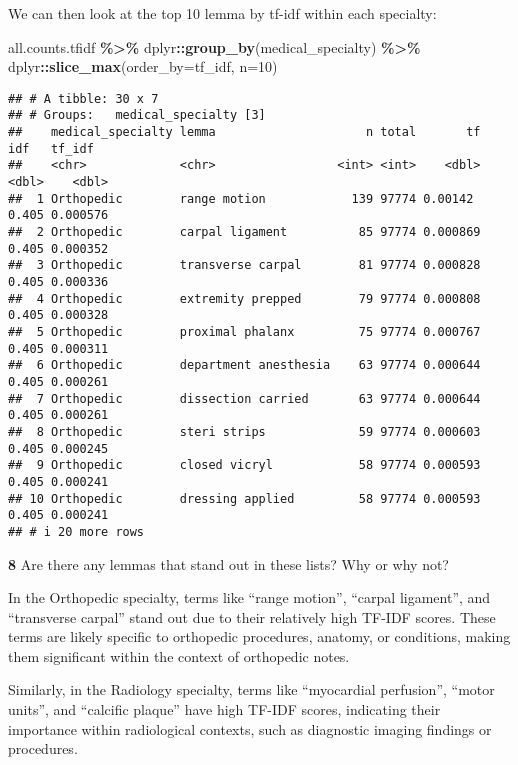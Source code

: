 \documentclass[
]{article}
\newenvironment{Shaded}{\begin{snugshade}}{\end{snugshade}}
\newcommand{\AttributeTok}[1]{\textcolor[rgb]{0.13,0.29,0.53}{#1}}
\newcommand{\DecValTok}[1]{\textcolor[rgb]{0.00,0.00,0.81}{#1}}
\newcommand{\FunctionTok}[1]{\textcolor[rgb]{0.13,0.29,0.53}{\textbf{#1}}}
\newcommand{\NormalTok}[1]{#1}
\newcommand{\SpecialCharTok}[1]{\textcolor[rgb]{0.81,0.36,0.00}{\textbf{#1}}}
\begin{document}
We can then look at the top 10 lemma by tf-idf within each specialty:

\begin{Shaded}
\begin{Highlighting}[]
\NormalTok{all.counts.tfidf }\SpecialCharTok{\%\textgreater{}\%}\NormalTok{ dplyr}\SpecialCharTok{::}\FunctionTok{group\_by}\NormalTok{(medical\_specialty) }\SpecialCharTok{\%\textgreater{}\%}\NormalTok{ dplyr}\SpecialCharTok{::}\FunctionTok{slice\_max}\NormalTok{(}\AttributeTok{order\_by=}\NormalTok{tf\_idf, }\AttributeTok{n=}\DecValTok{10}\NormalTok{)}
\end{Highlighting}
\end{Shaded}

\begin{verbatim}
## # A tibble: 30 x 7
## # Groups:   medical_specialty [3]
##    medical_specialty lemma                     n total       tf   idf   tf_idf
##    <chr>             <chr>                 <int> <int>    <dbl> <dbl>    <dbl>
##  1 Orthopedic        range motion            139 97774 0.00142  0.405 0.000576
##  2 Orthopedic        carpal ligament          85 97774 0.000869 0.405 0.000352
##  3 Orthopedic        transverse carpal        81 97774 0.000828 0.405 0.000336
##  4 Orthopedic        extremity prepped        79 97774 0.000808 0.405 0.000328
##  5 Orthopedic        proximal phalanx         75 97774 0.000767 0.405 0.000311
##  6 Orthopedic        department anesthesia    63 97774 0.000644 0.405 0.000261
##  7 Orthopedic        dissection carried       63 97774 0.000644 0.405 0.000261
##  8 Orthopedic        steri strips             59 97774 0.000603 0.405 0.000245
##  9 Orthopedic        closed vicryl            58 97774 0.000593 0.405 0.000241
## 10 Orthopedic        dressing applied         58 97774 0.000593 0.405 0.000241
## # i 20 more rows
\end{verbatim}

\textbf{8} Are there any lemmas that stand out in these lists? Why or
why not?

In the Orthopedic specialty, terms like ``range motion'', ``carpal
ligament'', and ``transverse carpal'' stand out due to their relatively
high TF-IDF scores. These terms are likely specific to orthopedic
procedures, anatomy, or conditions, making them significant within the
context of orthopedic notes.

Similarly, in the Radiology specialty, terms like ``myocardial
perfusion'', ``motor units'', and ``calcific plaque'' have high TF-IDF
scores, indicating their importance within radiological contexts, such
as diagnostic imaging findings or procedures.
\end{document}
